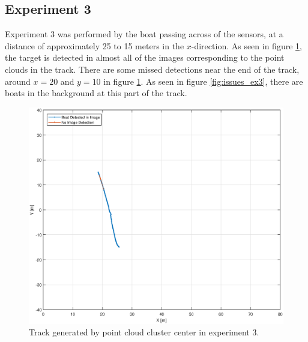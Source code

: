 \subsection{Experiment 3}
Experiment 3 was performed by the boat passing across of the sensors, at a distance of approximately 25 to 15 meters in the $x$-direction. As seen in figure \ref{fig:ex3_track}, the target is detected in almost all of the images corresponding to the point clouds in the track. There are some missed detections near the end of the track, around $x=20$ and $y=10$ in figure \ref{fig:ex3_track}. As seen in figure \ref{fig:issues_ex3}, there are boats in the background at this part of the track.
\begin{figure}[H]
	\centering
	\includegraphics[width=.8\linewidth]{fig/exp_3_track.eps}
	\caption{Track generated by point cloud cluster center in experiment 3.}
	\label{fig:ex3_track}
\end{figure}
